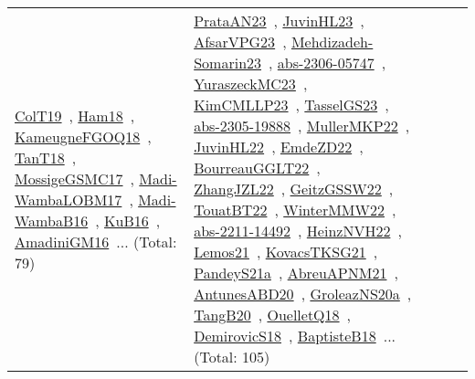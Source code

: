 {\begin{longtable}{lp{3cm}>{\raggedright\arraybackslash}p{6cm}>{\raggedright\arraybackslash}p{6cm}>{\raggedright\arraybackslash}p{8cm}}
\href{../works/ColT19.pdf}{ColT19}~\cite{ColT19}, \href{../works/Ham18.pdf}{Ham18}~\cite{Ham18}, \href{../works/KameugneFGOQ18.pdf}{KameugneFGOQ18}~\cite{KameugneFGOQ18}, \href{../works/TanT18.pdf}{TanT18}~\cite{TanT18}, \href{../works/MossigeGSMC17.pdf}{MossigeGSMC17}~\cite{MossigeGSMC17}, \href{../works/Madi-WambaLOBM17.pdf}{Madi-WambaLOBM17}~\cite{Madi-WambaLOBM17}, \href{../works/Madi-WambaB16.pdf}{Madi-WambaB16}~\cite{Madi-WambaB16}, \href{../works/KuB16.pdf}{KuB16}~\cite{KuB16}, \href{../works/AmadiniGM16.pdf}{AmadiniGM16}~\cite{AmadiniGM16}... (Total: 79) & \href{../works/PrataAN23.pdf}{PrataAN23}~\cite{PrataAN23}, \href{../works/JuvinHL23.pdf}{JuvinHL23}~\cite{JuvinHL23}, \href{../works/AfsarVPG23.pdf}{AfsarVPG23}~\cite{AfsarVPG23}, \href{../works/Mehdizadeh-Somarin23.pdf}{Mehdizadeh-Somarin23}~\cite{Mehdizadeh-Somarin23}, \href{../works/abs-2306-05747.pdf}{abs-2306-05747}~\cite{abs-2306-05747}, \href{../works/YuraszeckMC23.pdf}{YuraszeckMC23}~\cite{YuraszeckMC23}, \href{../works/KimCMLLP23.pdf}{KimCMLLP23}~\cite{KimCMLLP23}, \href{../works/TasselGS23.pdf}{TasselGS23}~\cite{TasselGS23}, \href{../works/abs-2305-19888.pdf}{abs-2305-19888}~\cite{abs-2305-19888}, \href{../works/MullerMKP22.pdf}{MullerMKP22}~\cite{MullerMKP22}, \href{../works/JuvinHL22.pdf}{JuvinHL22}~\cite{JuvinHL22}, \href{../works/EmdeZD22.pdf}{EmdeZD22}~\cite{EmdeZD22}, \href{../works/BourreauGGLT22.pdf}{BourreauGGLT22}~\cite{BourreauGGLT22}, \href{../works/ZhangJZL22.pdf}{ZhangJZL22}~\cite{ZhangJZL22}, \href{../works/GeitzGSSW22.pdf}{GeitzGSSW22}~\cite{GeitzGSSW22}, \href{../works/TouatBT22.pdf}{TouatBT22}~\cite{TouatBT22}, \href{../works/WinterMMW22.pdf}{WinterMMW22}~\cite{WinterMMW22}, \href{../works/abs-2211-14492.pdf}{abs-2211-14492}~\cite{abs-2211-14492}, \href{../works/HeinzNVH22.pdf}{HeinzNVH22}~\cite{HeinzNVH22}, \href{../works/Lemos21.pdf}{Lemos21}~\cite{Lemos21}, \href{../works/KovacsTKSG21.pdf}{KovacsTKSG21}~\cite{KovacsTKSG21}, \href{../works/PandeyS21a.pdf}{PandeyS21a}~\cite{PandeyS21a}, \href{../works/AbreuAPNM21.pdf}{AbreuAPNM21}~\cite{AbreuAPNM21}, \href{../works/AntunesABD20.pdf}{AntunesABD20}~\cite{AntunesABD20}, \href{../works/GroleazNS20a.pdf}{GroleazNS20a}~\cite{GroleazNS20a}, \href{../works/TangB20.pdf}{TangB20}~\cite{TangB20}, \href{../works/OuelletQ18.pdf}{OuelletQ18}~\cite{OuelletQ18}, \href{../works/DemirovicS18.pdf}{DemirovicS18}~\cite{DemirovicS18}, \href{../works/BaptisteB18.pdf}{BaptisteB18}~\cite{BaptisteB18}... (Total: 105)\\

\end{longtable}}

